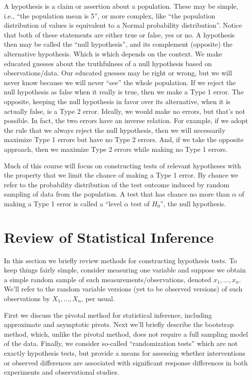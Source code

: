 \documentclass[
]{book}
\theoremstyle{definition}
\theoremstyle{definition}
\theoremstyle{definition}
\theoremstyle{definition}
\theoremstyle{remark}
\begin{document}
A hypothesis is a claim or assertion about a population. These may be simple, i.e., ``the population mean is 5'', or more complex, like ``the population distribution of values is equivalent to a Normal probability distribution''. Notice that both of these statements are either true or false, yes or no. A hypothesis then may be called the ``null hypothesis'', and its complement (opposite) the alternative hypothesis. Which is which depends on the context. We make educated guesses about the truthfulness of a null hypothesis based on observations/data. Our educated guesses may be right or wrong, but we will never know because we will never ``see'' the whole population. If we reject the null hypothesis as false when it really is true, then we make a Type 1 error. The opposite, keeping the null hypothesis in favor over its alternative, when it is actually false, is a Type 2 error. Ideally, we would make no errors, but that's not possible. In fact, the two errors have an inverse relation. For example, if we adopt the rule that we always reject the null hypothesis, then we will necessarily maximize Type 1 errors but have no Type 2 errors. And, if we take the opposite approach, then we maximize Type 2 errors while making no Type 1 errors.

Much of this course will focus on constructing tests of relevant hypotheses with the property that we limit the chance of making a Type 1 error. By chance we refer to the probability distribution of the test outcome induced by random sampling of data from the population. A test that has chance no more than \(\alpha\) of making a Type 1 error is called a ``level \(\alpha\) test of \(H_0\)'', the null hypothesis.

\hypertarget{review-of-statistical-inference}{%
\chapter{Review of Statistical Inference}\label{review-of-statistical-inference}}

In this section we briefly review methods for constructing hypothesis tests. To keep things fairly simple, consider measuring one variable and suppose we obtain a simple random sample of such measurements/observations, denoted \(x_1, \ldots, x_n\). We'll refer to the random variable versions (yet to be observed versions) of such observations by \(X_1, \ldots, X_n\), per usual.

First we discuss the pivotal method for statistical inference, including approximate and asymptotic pivots. Next we'll briefly describe the bootstrap method, which, unlike the pivotal method, does not require a full sampling model of the data. Finally, we consider so-called ``randomization tests'' which are not exactly hypothesis tests, but provide a means for assessing whether interventions or observed differences are associated with significant response differences in both experiments and observational studies.
\end{document}
